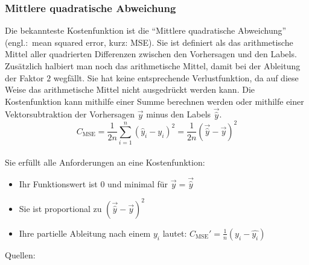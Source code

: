 \subsubsection{Mittlere quadratische Abweichung}
Die bekannteste Kostenfunktion ist die ``Mittlere quadratische Abweichung''
(engl.:\ mean squared error, kurz: MSE). Sie ist definiert als das arithmetische Mittel
aller quadrierten Differenzen zwischen den Vorhersagen und den Labels.
Zusätzlich halbiert man noch das arithmetische Mittel, damit bei der Ableitung der Faktor
$2$ wegfällt. Sie hat keine entsprechende Verlustfunktion, da auf diese Weise das
arithmetische Mittel nicht ausgedrückt werden kann.
Die Kostenfunktion kann mithilfe einer Summe berechnen werden oder mithilfe
einer Vektorsubtraktion der Vorhersagen $\vec{y}$ minus den Labels
$\vec{\hat{y}}$.
\\
\begin{equation}\label{eq:MSE}
  C_{\text{MSE}} = \frac{1}{2n}\sum_{i=1}^{n}{(\hat{y}_i - y_i)}^2 = \frac{1}{2n}{(\vec{\hat{y}} - \vec{y})}^2
\end{equation}
\\
Sie erfüllt alle Anforderungen an eine Kostenfunktion:
\begin{itemize}
\item{Ihr Funktionswert ist 0 und minimal für $\vec{y} = \vec{\hat{y}}$}
\item{Sie ist proportional zu ${(\vec{\hat{y}}-\vec{y})}^2$}
\item{Ihre partielle Ableitung nach einem $y_i$ lautet: $C_{\text{MSE}}'=\frac{1}{n}(y_i-\hat{y_i})$}
\end{itemize}
\para{}
Quellen: \cite{Nielsen}

